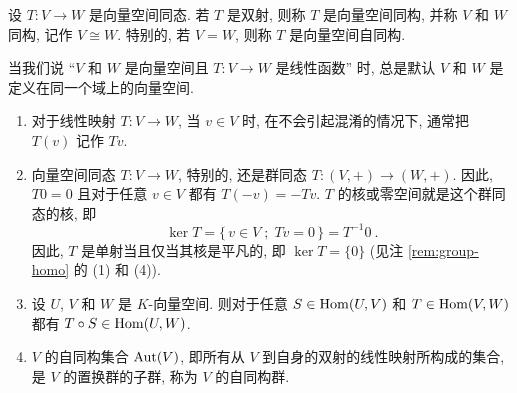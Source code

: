 \begin{definition}[向量空间同构]
    设 \(T \colon V \to W\) 是向量空间同态. 若 \(T\) 是双射, 则称 \(T\) 是向量空间同构, 并称 \(V\) 和 \(W\) 同构, 记作 \(V \cong W\). 特别的, 若 \(V = W\), 则称 \(T\) 是向量空间自同构.
\end{definition}

当我们说 ``\(V\) 和 \(W\) 是向量空间且 \(T \colon V \to W\) 是线性函数'' 时, 总是默认 \(V\) 和 \(W\) 是定义在同一个域上的向量空间.

\begin{remark}
    \begin{enumerate}
        \item 对于线性映射 \(T \colon V \to W\), 当 \(v \in V\) 时, 在不会引起混淆的情况下, 通常把 \(T(v)\) 记作 \(T v\).
        \item 向量空间同态 \(T \colon V \to W\), 特别的, 还是群同态 \(T \colon (V, +) \to (W, +)\). 因此, \(T 0 = 0\) 且对于任意 \(v \in V\) 都有 \(T(- v) = - T v\). \(T\) 的核或零空间就是这个群同态的核, 即
        \[
            \ker T = \{\, v \in V \;;\; T v = 0 \,\} = T^{- 1} 0\ .
        \]
        因此, \(T\) 是单射当且仅当其核是平凡的, 即 \(\ker T = \{0\}\) (见注 \ref{rem:group-homo} 的 (1) 和 (4)).
        \item 设 \(U\), \(V\) 和 \(W\) 是 \(K\)-向量空间. 则对于任意 \(S \in \operatorname{Hom}(U, V)\) 和 \(T \in \operatorname{Hom}(V, W)\) 都有 \(T \circ S \in \operatorname{Hom}(U, W)\).
        \item \(V\) 的自同构集合 \(\operatorname{Aut}(V)\), 即所有从 \(V\) 到自身的双射的线性映射所构成的集合, 是 \(V\) 的置换群的子群, 称为 \(V\) 的自同构群.
    \end{enumerate}
\end{remark}

